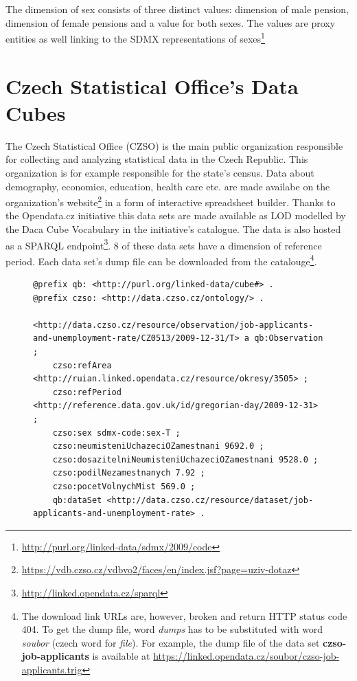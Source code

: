 The dimension of sex consists of three distinct values: dimension of male pension, dimension of female pensions and a value for both sexes. The values are proxy entities as well linking to the SDMX representations of sexes\footnote{\href{http://purl.org/linked-data/sdmx/2009/code}{http://purl.org/linked-data/sdmx/2009/code}}

\section{Czech Statistical Office's Data Cubes}

The Czech Statistical Office (CZSO) is the main public organization responsible for collecting and analyzing statistical data in the Czech Republic. This organization is for example responsible for the state's census. Data about demography, economics, education, health care etc. are made availabe on the organization's website\footnote{\href{https://vdb.czso.cz/vdbvo2/faces/en/index.jsf?page=uziv-dotaz}{https://vdb.czso.cz/vdbvo2/faces/en/index.jsf?page=uziv-dotaz}} in a form of interactive spreadsheet builder. Thanks to the Opendata.cz initiative this data sets are made available as LOD modelled by the Daca Cube Vocabulary in the initiative's catalogue. The data is also hosted as a SPARQL endpoint\footnote{\href{http://linked.opendata.cz/sparql}{http://linked.opendata.cz/sparql}}. 8 of these data sets have a dimension of reference period. Each data set’s dump file can be downloaded from the catalouge\footnote{The download link URLs are, however, broken and return HTTP status code 404. To get the dump file, word \textit{dumps} has to be substituted with word \textit{soubor} (czech word for \textit{file}). For example, the dump file of the data set \textbf{czso-job-applicants} is available at \href{https://linked.opendata.cz/soubor/czso-job-applicants.trig}{https://linked.opendata.cz/soubor/czso-job-applicants.trig}}.

\begin{figure}[h]
\begin{lstlisting}[language = turtle, caption={Example of an observation from the CZSO data sets}, label={turtleexample},captionpos=b escapeinside={(*@}{@*)}]
@prefix qb: <http://purl.org/linked-data/cube#> .
@prefix czso: <http://data.czso.cz/ontology/> .

<http://data.czso.cz/resource/observation/job-applicants-and-unemployment-rate/CZ0513/2009-12-31/T> a qb:Observation ;
    czso:refArea <http://ruian.linked.opendata.cz/resource/okresy/3505> ;
    czso:refPeriod <http://reference.data.gov.uk/id/gregorian-day/2009-12-31> ;
    czso:sex sdmx-code:sex-T ;
    czso:neumisteniUchazeciOZamestnani 9692.0 ;
    czso:dosazitelniNeumisteniUchazeciOZamestnani 9528.0 ;
    czso:podilNezamestnanych 7.92 ;
    czso:pocetVolnychMist 569.0 ;
    qb:dataSet <http://data.czso.cz/resource/dataset/job-applicants-and-unemployment-rate> .
\end{lstlisting}
\end{figure}

